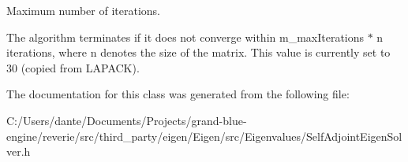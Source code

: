 Maximum number of iterations. 

The algorithm terminates if it does not converge within m\+\_\+max\+Iterations $\ast$ n iterations, where n denotes the size of the matrix. This value is currently set to 30 (copied from L\+A\+P\+A\+CK). 

The documentation for this class was generated from the following file\+:\begin{DoxyCompactItemize}
\item 
C\+:/\+Users/dante/\+Documents/\+Projects/grand-\/blue-\/engine/reverie/src/third\+\_\+party/eigen/\+Eigen/src/\+Eigenvalues/Self\+Adjoint\+Eigen\+Solver.\+h\end{DoxyCompactItemize}

